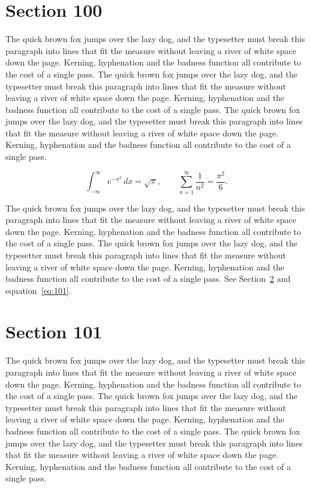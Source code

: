 \documentclass{article}
\begin{document}
\section{Section 100}
\label{sec:100}
The quick brown fox jumps over the lazy dog, and the typesetter must break this paragraph into lines that fit the measure without leaving a river of white space down the page. Kerning, hyphenation and the badness function all contribute to the cost of a single pass. The quick brown fox jumps over the lazy dog, and the typesetter must break this paragraph into lines that fit the measure without leaving a river of white space down the page. Kerning, hyphenation and the badness function all contribute to the cost of a single pass. The quick brown fox jumps over the lazy dog, and the typesetter must break this paragraph into lines that fit the measure without leaving a river of white space down the page. Kerning, hyphenation and the badness function all contribute to the cost of a single pass. 

\begin{equation}\label{eq:100}
\int_{-\infty}^{\infty} e^{-x^{2}}\,dx = \sqrt{\pi}, \qquad
\sum_{n=1}^{\infty} \frac{1}{n^{2}} = \frac{\pi^{2}}{6}.
\end{equation}

The quick brown fox jumps over the lazy dog, and the typesetter must break this paragraph into lines that fit the measure without leaving a river of white space down the page. Kerning, hyphenation and the badness function all contribute to the cost of a single pass. The quick brown fox jumps over the lazy dog, and the typesetter must break this paragraph into lines that fit the measure without leaving a river of white space down the page. Kerning, hyphenation and the badness function all contribute to the cost of a single pass. 
See Section~\ref{sec:101} and equation~\eqref{eq:101}.
\section{Section 101}
\label{sec:101}
The quick brown fox jumps over the lazy dog, and the typesetter must break this paragraph into lines that fit the measure without leaving a river of white space down the page. Kerning, hyphenation and the badness function all contribute to the cost of a single pass. The quick brown fox jumps over the lazy dog, and the typesetter must break this paragraph into lines that fit the measure without leaving a river of white space down the page. Kerning, hyphenation and the badness function all contribute to the cost of a single pass. The quick brown fox jumps over the lazy dog, and the typesetter must break this paragraph into lines that fit the measure without leaving a river of white space down the page. Kerning, hyphenation and the badness function all contribute to the cost of a single pass. 
\end{document}
